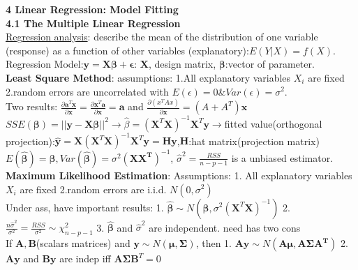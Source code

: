 \documentclass[10pt,a4paper,landscape]{article}
\begin{document}
\begin{multicols}{3}
{	
	
	

{\small\textbf{4 Linear Regression: Model Fitting}}\\
\textbf{4.1 The Multiple Linear Regression}\\
\underline{Regression analysis}: describe the mean of the distribution of one variable (response) as a function of other variables (explanatory):$E(Y|X)=f(X)$.\\
Regression Model:$\boldsymbol{y}=\boldsymbol{X\beta}+\boldsymbol{\epsilon}$: $\boldsymbol{X}$, design matrix, $\boldsymbol{\beta}$:vector of parameter.\\
\textbf{Least Square Method}: assumptions: 1.All explanatory variables $X_i$ are fixed 2.random errors are uncorrelated with $E(\epsilon)=0$\&$Var(\epsilon)=\sigma^2$.\\
Two results: $\frac{\partial{\boldsymbol{a}^T\boldsymbol{x}}}{\partial{\boldsymbol{x}}}=\frac{\partial{\boldsymbol{x}^T\boldsymbol{a}}}{\partial{\boldsymbol{x}}}=\boldsymbol{a}$ and $\frac{\partial{(x^TAx)}}{\partial{\boldsymbol{x}}}=(A+A^T)\boldsymbol{x}$\\
$SSE(\boldsymbol{\beta})=||\boldsymbol{y}-\boldsymbol{X}\boldsymbol{\beta}||^2$$\rightarrow$$\hat{\beta}=(\boldsymbol{X}^T\boldsymbol{X})^{-1}\boldsymbol{X}^T\boldsymbol{y}$$\rightarrow$fitted value(orthogonal projection):$\hat{\boldsymbol{y}}=\boldsymbol{X}(\boldsymbol{X}^T\boldsymbol{X})^{-1}\boldsymbol{X}^T\boldsymbol{y}=\boldsymbol{H}\boldsymbol{y}$,$\boldsymbol{H}$:hat matrix(projection matrix)\\
$E(\hat{\boldsymbol{\beta}})=\boldsymbol{\beta}, Var(\hat{\boldsymbol{\beta}})=\sigma^2(\boldsymbol{X X^T})^{-1}$, $\hat{\sigma}^2=\frac{RSS}{n-p-1}$ is a unbiased estimator.
\textbf{Maximum Likelihood Estimation}: Assumptions: 1. All explanatory variables $X_i$ are fixed 2.random errors are i.i.d. $N(0,\sigma^2)$\\
Under ass, have important results: 1. $\hat{\boldsymbol{\beta}}\sim N(\boldsymbol{\beta},\sigma^2(\boldsymbol{X}^T\boldsymbol{X})^{-1}) $ 2. $\frac{n\hat{\sigma}^2}{\sigma^2}=\frac{RSS}{\sigma^2}\sim\chi^2_{n-p-1}$ 3. $\hat{\boldsymbol{\beta}}$ and $\hat{\sigma}^2$ are independent.  need has two cons\\
If $\boldsymbol{A},\boldsymbol{B}$(scalars matrices) and $\boldsymbol{y}\sim N(\boldsymbol{\mu}, \boldsymbol{\Sigma})$, then 1. $\boldsymbol{Ay}\sim N(\boldsymbol{A\mu}, \boldsymbol{A\Sigma A^T})$ 2.$\boldsymbol{Ay}$ and $\boldsymbol{By}$ are indep iff $\boldsymbol{A\Sigma B}^T=0$


}
\end{multicols}
\end{document}
